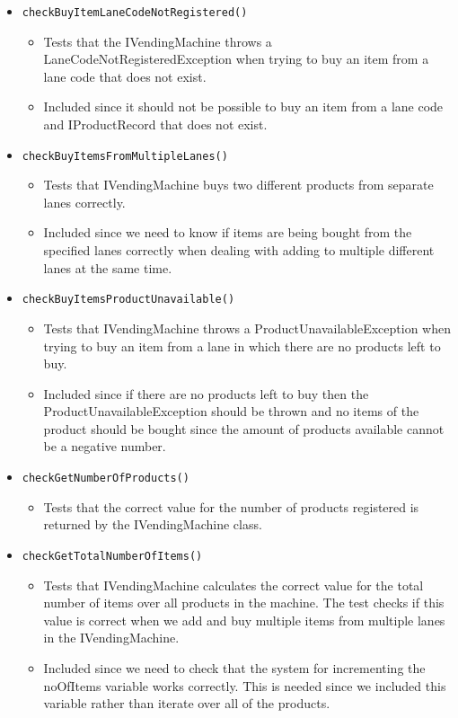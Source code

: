 \documentclass{article}
\begin{document}
\begin{itemize}
\item \verb+checkBuyItemLaneCodeNotRegistered()+
\begin{itemize}
\item Tests that the IVendingMachine throws a LaneCodeNotRegisteredException when trying to buy an item from a lane code that does not exist.
\item Included since it should not be possible to buy an item from a lane code and IProductRecord that does not exist.
\end{itemize}

\item \verb+checkBuyItemsFromMultipleLanes()+
\begin{itemize}
\item Tests that IVendingMachine buys two different products from separate lanes correctly.
\item Included since we need to know if items are being bought from the specified lanes correctly when dealing with adding to multiple different lanes at the same time.
\end{itemize}

\item \verb+checkBuyItemsProductUnavailable()+
\begin{itemize}
\item Tests that IVendingMachine throws a ProductUnavailableException when trying to buy an item from a lane in which there are no products left to buy.
\item Included since if there are no products left to buy then the ProductUnavailableException should be thrown and no items of the product should be bought since the amount of products available cannot be a negative number.
\end{itemize}

\item \verb+checkGetNumberOfProducts()+
\begin{itemize}
\item Tests that the correct value for the number of products registered is returned by the IVendingMachine class.
\end{itemize}

\item \verb+checkGetTotalNumberOfItems()+
\begin{itemize}
\item Tests that IVendingMachine calculates the correct value for the total number of items over all products in the machine. The test checks if this value is correct when we add and buy multiple items from multiple lanes in the IVendingMachine.
\item Included since we need to check that the system for incrementing the noOfItems variable works correctly. This is needed since we included this variable rather than iterate over all of the products.
\end{itemize}


\end{itemize}
\end{document}
